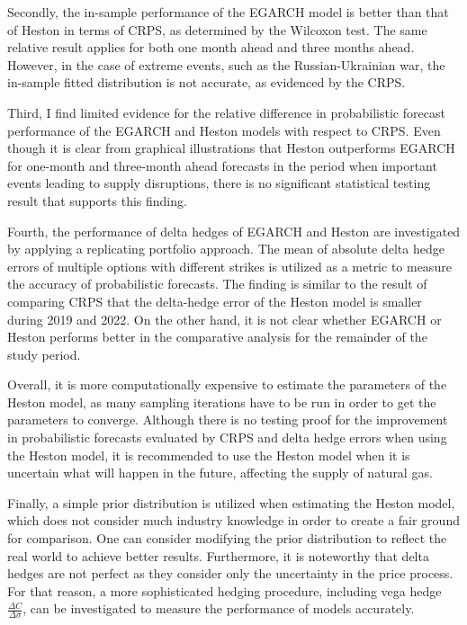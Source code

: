 \documentclass[12pt,a4paper]{article}
\numberwithin{equation}{section}
\begin{document}
Secondly, the in-sample performance of the EGARCH model is better than that of Heston in terms of CRPS, as determined by the Wilcoxon test. The same relative result applies for both one month ahead and three months ahead. However, in the case of extreme events, such as the Russian-Ukrainian war, the in-sample fitted distribution is not accurate, as evidenced by the CRPS.

Third, I find limited evidence for the relative difference in probabilistic forecast performance of the EGARCH and Heston models with respect to CRPS. Even though it is clear from graphical illustrations that Heston outperforms EGARCH for one-month and three-month ahead forecasts in the period when important events leading to supply disruptions, there is no significant statistical testing result that supports this finding.

Fourth, the performance of delta hedges of EGARCH and Heston are investigated by applying a replicating portfolio approach. The mean of absolute delta hedge errors of multiple options with different strikes is utilized as a metric to measure the accuracy of probabilistic forecasts. The finding is similar to the result of comparing CRPS that the delta-hedge error of the Heston model is smaller during 2019 and 2022. On the other hand, it is not clear whether EGARCH or Heston performs better in the comparative analysis for the remainder of the study period.

Overall, it is more computationally expensive to estimate the parameters of the Heston model, as many sampling iterations have to be run in order to get the parameters to converge. Although there is no testing proof for the improvement in probabilistic forecasts evaluated by CRPS and delta hedge errors when using the Heston model, it is recommended to use the Heston model when it is uncertain what will happen in the future, affecting the supply of natural gas.

Finally, a simple prior distribution is utilized when estimating the Heston model, which does not consider much industry knowledge in order to create a fair ground for comparison. One can consider modifying the prior distribution to reflect the real world to achieve better results. Furthermore, it is noteworthy that delta hedges are not perfect as they consider only the uncertainty in the price process. For that reason, a more sophisticated hedging procedure, including vega hedge $\frac{\Delta C}{\Delta \sigma}$, can be investigated to measure the performance of models accurately.
\end{document}
